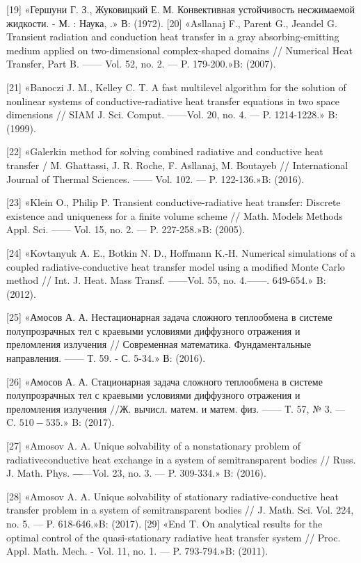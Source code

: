 \documentclass[10pt]{article}
\begin{document}
[19] «Гершуни Г. З., Жуковицкий Е. М. Конвективная устойчивость несжимаемой жидкости. - М. : Наука, .» В: (1972). [20] «Asllanaj F., Parent G., Jeandel G. Transient radiation and conduction heat transfer in a gray absorbing-emitting medium applied on two-dimensional complex-shaped domains // Numerical Heat Transfer, Part B. —— Vol. 52, no. 2. — P. 179-200.»B: (2007).

[21] «Banoczi J. M., Kelley C. T. A fast multilevel algorithm for the solution of nonlinear systems of conductive-radiative heat transfer equations in two space dimensions // SIAM J. Sci. Comput. ——Vol. 20, no. 4. — P. 1214-1228.» B: (1999).

[22] «Galerkin method for solving combined radiative and conductive heat transfer / M. Ghattassi, J. R. Roche, F. Asllanaj, M. Boutayeb // International Journal of Thermal Sciences. —— Vol. 102. — P. 122-136.»B: (2016).

[23] «Klein O., Philip P. Transient conductive-radiative heat transfer: Discrete existence and uniqueness for a finite volume scheme // Math. Models Methods Appl. Sci. —— Vol. 15, no. 2. — P. 227-258.»B: (2005).

[24] «Kovtanyuk A. E., Botkin N. D., Hoffmann K.-H. Numerical simulations of a coupled radiative-conductive heat transfer model using a modified Monte Carlo method // Int. J. Heat. Mass Transf. ——Vol. 55, no. 4.——. 649-654.» B: (2012).

[25] «Амосов А. А. Нестационарная задача сложного теплообмена в системе полупрозрачных тел с краевыми условиями диффузного отражения и преломления излучения // Современная математика. Фундаментальные направления. —— Т. 59. - С. 5-34.» В: (2016).

[26] «Амосов А. А. Стационарная задача сложного теплообмена в системе полупрозрачных тел с краевыми условиями диффузного отражения и преломления излучения $/ / Ж$. вычисл. матем. и матем. физ. —— Т. 57, № 3. — C. $510-535 . »$ B: (2017).

[27] «Amosov A. A. Unique solvability of a nonstationary problem of radiativeconductive heat exchange in a system of semitransparent bodies // Russ. J. Math. Phys. ―—Vol. 23, no. 3. — P. 309-334.» B: (2016).

[28] «Amosov A. A. Unique solvability of stationary radiative-conductive heat transfer problem in a system of semitransparent bodies // J. Math. Sci. Vol. 224, no. 5. — P. 618-646.»B: (2017). [29] «End T. On analytical results for the optimal control of the quasi-stationary radiative heat transfer system // Proc. Appl. Math. Mech. - Vol. 11, no. 1. — P. 793-794.»B: (2011).
\end{document}
